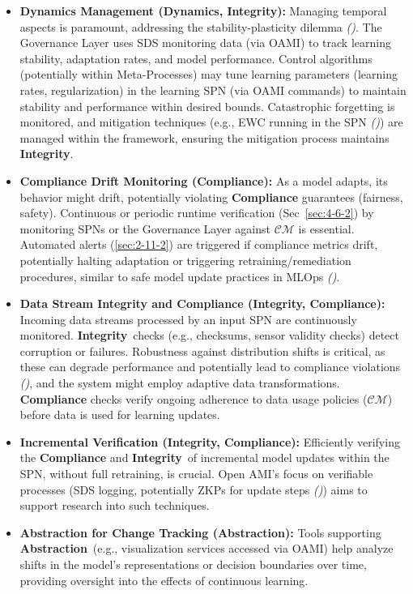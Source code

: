 \documentclass[12pt,a4paper]{report}
\renewcommand{\citep}[1]{\textit{\scriptsize{(\cite{#1})}}}
\newcommand{\Compliance}{\textbf{Compliance}}
\newcommand{\Integrity}{\textbf{Integrity}}
\newcommand{\Abstraction}{\textbf{Abstraction}}
\newcommand{\Dynamics}{\textbf{Dynamics}}
\begin{document}
	\begin{itemize}
		\item \textbf{Dynamics Management (\Dynamics, Integrity):} Managing temporal aspects is paramount, addressing the stability-plasticity dilemma \citep{Wang2024ContinualLearningSurvey, AdditionalCitationRef24}. The Governance Layer uses SDS monitoring data (via OAMI) to track learning stability, adaptation rates, and model performance. Control algorithms (potentially within Meta-Processes) may tune learning parameters (learning rates, regularization) in the learning SPN (via OAMI commands) to maintain stability and performance within desired bounds. Catastrophic forgetting is monitored, and mitigation techniques (e.g., EWC running in the SPN \citep{Kirkpatrick2017OvercomingCF}) are managed within the framework, ensuring the mitigation process maintains \Integrity.
		\item \textbf{Compliance Drift Monitoring (\Compliance):} As a model adapts, its behavior might drift, potentially violating \textbf{Compliance} guarantees (fairness, safety). Continuous or periodic runtime verification (Sec~\ref{sec:4-6-2}) by monitoring SPNs or the Governance Layer against $\mathcal{CM}$ is essential. Automated alerts (\ref{sec:2-11-2}) are triggered if compliance metrics drift, potentially halting adaptation or triggering retraining/remediation procedures, similar to safe model update practices in MLOps \citep{Eken2024MLOpsReview}.
		\item \textbf{Data Stream Integrity and Compliance (\Integrity, Compliance):} Incoming data streams processed by an input SPN are continuously monitored. \Integrity\ checks (e.g., checksums, sensor validity checks) detect corruption or failures. Robustness against distribution shifts is critical, as these can degrade performance and potentially lead to compliance violations \citep{AdditionalCitationRef53}, and the system might employ adaptive data transformations. \textbf{Compliance} checks verify ongoing adherence to data usage policies ($\mathcal{CM}$) before data is used for learning updates.
		\item \textbf{Incremental Verification (\Integrity, Compliance):} Efficiently verifying the \textbf{Compliance} and \Integrity\ of incremental model updates within the SPN, without full retraining, is crucial. Open AMI's focus on verifiable processes (SDS logging, potentially ZKPs for update steps \citep{Peng2025ZKMLSurvey}) aims to support research into such techniques.
		\item \textbf{Abstraction for Change Tracking (\Abstraction):} Tools supporting \Abstraction\ (e.g., visualization services accessed via OAMI) help analyze shifts in the model's representations or decision boundaries over time, providing oversight into the effects of continuous learning.
	\end{itemize}
	
\end{document}
